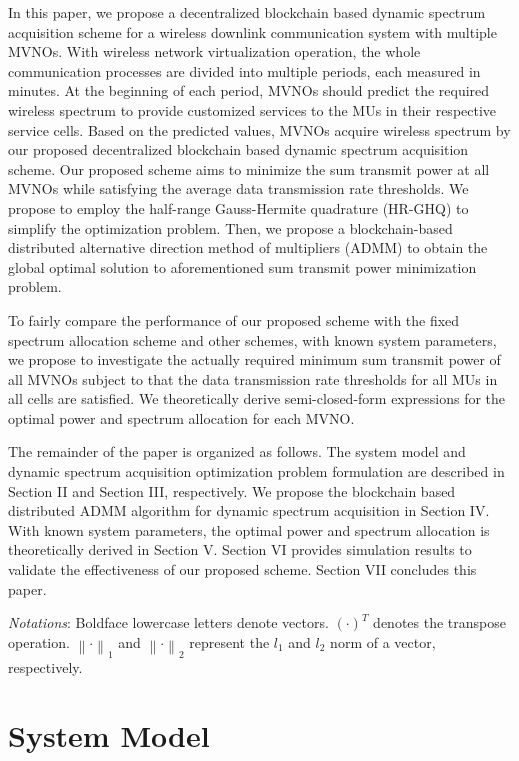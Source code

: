 \documentclass[journal]{IEEEtran}
\begin{document}
In this paper, we propose a decentralized blockchain based dynamic spectrum acquisition scheme for a wireless downlink communication system with multiple MVNOs. With wireless network virtualization operation, the whole communication processes are divided into multiple periods, each measured in minutes. At the beginning of each period, MVNOs should predict the required wireless spectrum to provide customized services to the MUs in their respective service cells. Based on the predicted values, MVNOs acquire wireless spectrum by our proposed decentralized blockchain based dynamic spectrum acquisition scheme. Our proposed scheme aims to minimize the sum transmit power at all MVNOs while satisfying the average data transmission rate thresholds. We propose to employ the half-range Gauss-Hermite quadrature (HR-GHQ) to simplify the optimization problem. Then, we propose a blockchain-based distributed alternative direction method of multipliers (ADMM) to obtain the global optimal solution to aforementioned sum transmit power minimization problem.

To fairly compare the performance of our proposed scheme with the fixed spectrum allocation scheme and other schemes, with known system parameters, we propose to investigate the {\color{red}actually} required minimum sum transmit power of all MVNOs subject to that the data transmission rate thresholds for all MUs in all cells are satisfied. We theoretically derive semi-closed-form expressions for the optimal power and spectrum allocation for each MVNO.

The remainder of the paper is organized as follows. The system model and dynamic spectrum acquisition optimization problem formulation are described in Section II and Section III, respectively. We propose the blockchain based distributed ADMM algorithm for dynamic spectrum acquisition in Section IV. With known system parameters, the optimal power and spectrum allocation is theoretically derived in Section V. Section VI provides simulation results to validate the effectiveness of our proposed scheme. Section VII concludes this paper.

\emph{Notations}: Boldface lowercase letters denote vectors. $\left(\cdot\right)^T$ denotes the transpose operation. $\left\|\cdot \right\|_1$ and $\left\|\cdot \right\|_2$ represent the $l_1$ and $l_2$ norm of a vector, respectively.

\section{System Model}
\end{document}
